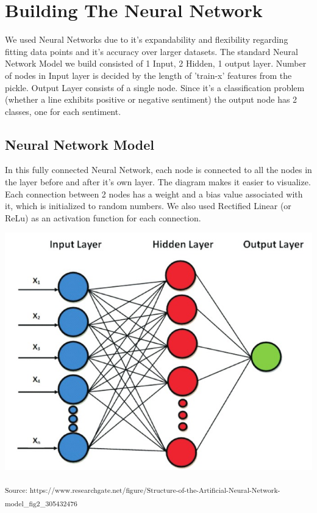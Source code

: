 \section{Building The Neural Network}
We used Neural Networks due to it's expandability and flexibility regarding fitting data points and it's accuracy over larger datasets. The standard Neural Network Model we build consisted of 1 Input, 2 Hidden, 1 output layer. Number of nodes in Input layer is decided by the length of 'train-x' features from the pickle. Output Layer consists of a single node. Since it's a classification problem (whether a line exhibits positive or negative sentiment) the output node has 2 classes, one for each sentiment.

\subsection{Neural Network Model}
In this fully connected Neural Network, each node is connected to all the nodes in the layer before and after it's own layer. The diagram makes it easier to visualize. Each connection between 2 nodes has a weight and a bias value associated with it, which is initialized to random numbers. We also used Rectified Linear (or ReLu) as an activation function for each connection. 

\includegraphics[scale=0.4]{Figures/nn_model.jpg}
\begin{center}
\textsubscript{Source: https://www.researchgate.net/figure/Structure-of-the-Artificial-Neural-Network-model_fig2_305432476}
\end{center}

